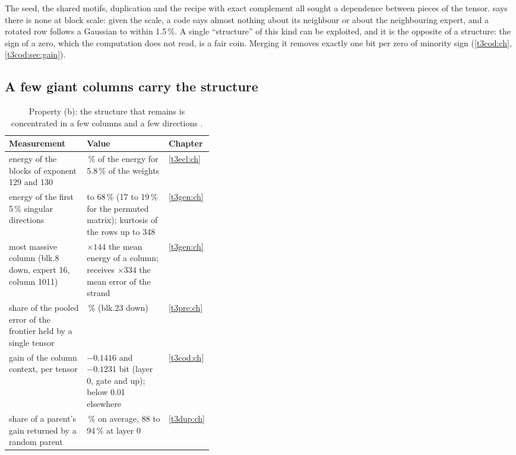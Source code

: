The seed, the shared motifs, duplication and the recipe with exact complement all sought a dependence between pieces of the tensor.  says there is none at block scale: given the scale, a code says almost nothing about its neighbour or about the neighbouring expert, and a rotated row follows a Gaussian to within 1.5\,\%. A single ``structure'' of this kind can be exploited, and it is the opposite of a structure: the sign of a zero, which the computation does not read, is a fair coin. Merging it removes exactly one bit per zero of minority sign (\cref{t3cod:ch}, \cref{t3cod:sec:gain}).

\subsection{A few giant columns carry the structure}\label{t3syn:sec:colonnes}

\begin{table}[ht]
\centering\small
\caption[Property (b): the giant columns]{Property (b): the structure that remains is concentrated in a few columns and a few directions \mes.}
\label{t3syn:tab:colonnes}
\begin{tabularx}{\linewidth}{@{}>{\raggedright\arraybackslash}X>{\raggedright\arraybackslash}p{0.40\linewidth}l@{}}
\toprule
Measurement & Value & Chapter \\
\midrule
energy of the blocks of exponent 129 and 130 & 74.2\,\% of the energy for 5.8\,\% of the weights & \cref{t3ecl:ch} \\
energy of the first 5\,\% singular directions & 23 to 68\,\% (17 to 19\,\% for the permuted matrix); kurtosis of the rows up to 348 & \cref{t3gen:ch} \\
most massive column (blk.8 down, expert 16, column 1011) & $\times 144$ the mean energy of a column; receives $\times 334$ the mean error of the strand & \cref{t3gen:ch} \\
share of the pooled error of the frontier held by a single tensor & 91.5\,\% (blk.23 down) & \cref{t3pre:ch} \\
gain of the column context, per tensor & $-0.1416$ and $-0.1231$ bit (layer 0, gate and up); below 0.01 elsewhere & \cref{t3cod:ch} \\
share of a parent's gain returned by a random parent & 46\,\% on average, 88 to 94\,\% at layer 0 & \cref{t3dup:ch} \\
\bottomrule
\end{tabularx}
\end{table}

